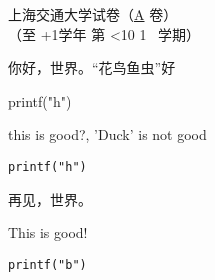 \documentclass[a4paper,12pt]{article}
\newcommand{\currentsemester}{
    \ifnum\month<10 
        1
    \else
        2
    \fi
  }
\newcommand{\school}{上海交通大学}
\newcommand{\papertype}{A}
\newcommand{\startyear}{\the\year}
\newcommand{\nextyear}{\the\numexpr\startyear+1\relax}
\newcommand{\semester}{\currentsemester}
\begin{document}
\begin{center}
   \school 试卷（\underline{\papertype} 卷）\\
   （\startyear 至 \nextyear 学年 第 \semester\ 学期） \\
\end{center}



你好，世界。“花鸟鱼虫”好

printf("h")

this is good?, 'Duck' is not good

\verb|printf("h")|

\newpage

再见，世界。

This is good!

\verb|printf("b")|

\label{LastPage}
\end{document}
